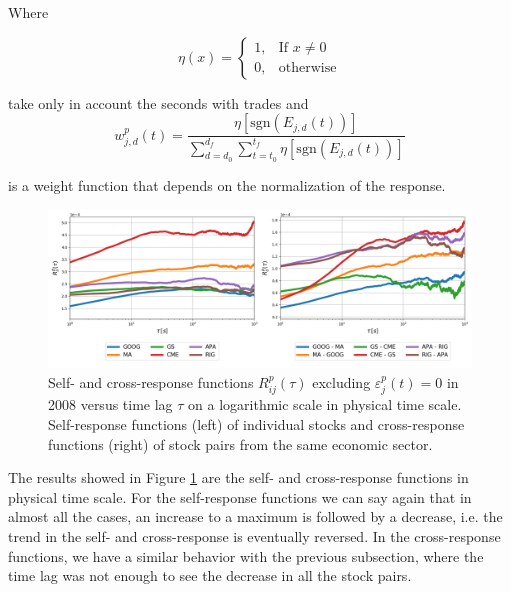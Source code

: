Where

\begin{equation}
    \eta\left(x\right)=\left\{ \begin{array}{cc}
    1, & \text{If }x\ne0 \\
    0, & \text{otherwise}
    \end{array}\right.
\end{equation}

take only in account the seconds with trades and
\begin{equation}
    w_{j,d}^{p}\left(t\right) = \frac{\eta\left[\text{sgn}
    \left(E_{j,d}\left( t\right)\right)\right]}{\sum_{d=d_{0}}^{d_{f}}
    \sum_{t=t_{0}}^{t_{f}} \eta\left[\text{sgn}\left(E_{j,d}
    \left(t\right)\right)\right]}
\end{equation}

is a weight function that depends on the normalization of the response.

\begin{figure}[htbp]
    \centering
    \includegraphics[width=\textwidth]
    {figures/03_responses_physical_scale_2008.png}
    \caption{Self- and cross-response functions $R^{p}_{ij}\left(\tau\right)$
             excluding $\varepsilon^{p}_{j}\left(t\right) = 0$ in 2008 versus
             time lag $\tau$ on a logarithmic scale in physical time scale.
             Self-response functions (left) of individual stocks and
             cross-response functions (right) of stock pairs from the same
             economic sector.}
    \label{fig:market_response_time_scale}
\end{figure}

The results showed in Figure \ref{fig:market_response_time_scale} are the
self- and cross-response functions in physical time scale. For the self-response
functions we can say again that in almost all the cases, an increase to a
maximum is followed by a decrease,
i.e. the trend in the self- and cross-response is eventually reversed.
In the cross-response functions, we have a similar behavior with the previous
subsection, where the time lag was not enough to see the decrease in all the
stock pairs.

